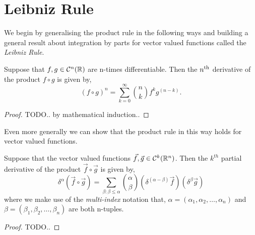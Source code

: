 
\section{Leibniz Rule} %
\label{sec:leibnizrule}

We begin by generalising the product rule in the following ways
and building a general result about integration by parts for
vector valued functions called the \emph{Leibniz Rule}.

\begin{prop}
  Suppose that $f,g \in \mathcal{C}^n(\mathbb{R})$ are n-times differentiable.
  Then the $n\textsuperscript{th}$ derivative of the product $f \circ g$ is given by,
  \[
    (f \circ g)^n = \sum_{k=0}^{\infty} \binom{n}{k} f^{k} g^(n-k).
  \]
\end{prop}

\begin{proof}
  TODO.. by mathematical induction..
\end{proof}

Even more generally we can show that the product rule in this way
holds for vector valued functions.

\begin{prop}
  Suppose that the vector valued functions $\vec{f},\vec{g} \in \mathcal{C}^k(\mathbb{R}^n)$.
  Then the $k^{th}$ partial derivative of the product $\vec{f} \circ \vec{g}$ is given by,
  \[
  \delta^{\alpha} (\vec{f} \circ \vec{g}) =
  \sum_{\beta : \beta \leq \alpha} \binom{\alpha}{\beta} (\delta^{(\alpha - \beta)} \vec{f}) (\delta^{\beta} \vec{g})
 \]
 where we make use of the \emph{multi-index} notation that,
 $\alpha = (\alpha_1, \alpha_2, \dots, \alpha_n)$ and $\beta = (\beta_1, \beta_2, \dots, \beta_n)$
 are both n-tuples.
\end{prop}

\begin{proof}
  TODO..
\end{proof}
